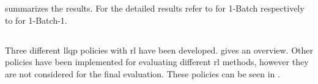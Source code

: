 \documentclass[draft=false]{seal_thesis}
\begin{document}
 summarizes the results. For the detailed results refer to  for 1-Batch respectively to  for 1-Batch-1.

\begin{table}[!ht]
\centering
{}
\caption{Speedup across all  of the batch policies with  against the  solver}
\label{tab:rl_batch_kpis_comp_gain}
\end{table}

\subsection{}
\label{subsec:rl_llqp}

Three different \gls{llqp} policies with \gls{rl} have been developed.  gives an overview. Other policies have been implemented for evaluating different \gls{rl} methods, however they are not considered for the final evaluation. These policies can be seen in .
\end{document}
